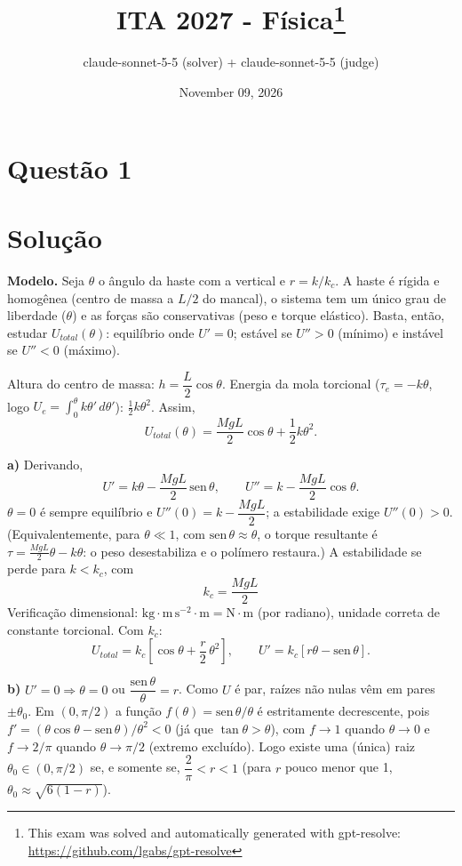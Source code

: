 \documentclass{article}%
\title{ITA 2027 - Física\thanks{This exam was solved and automatically generated with gpt-resolve: \url{https://github.com/lgabs/gpt-resolve}}}%
\author{claude{-}sonnet{-}5{-}5 (solver) + claude{-}sonnet{-}5{-}5 (judge)}%
\date{November 09, 2026}%
\begin{document}
%
\normalsize%
\maketitle%
\section*{Questão 1}

\section*{Solução}

\textbf{Modelo.} Seja $\theta$ o ângulo da haste com a vertical e $r=k/k_c$. A haste é rígida e homogênea (centro de massa a $L/2$ do mancal), o sistema tem um único grau de liberdade ($\theta$) e as forças são conservativas (peso e torque elástico). Basta, então, estudar $U_{total}(\theta)$: equilíbrio onde $U'=0$; estável se $U''>0$ (mínimo) e instável se $U''<0$ (máximo).

Altura do centro de massa: $h=\dfrac{L}{2}\cos\theta$. Energia da mola torcional ($\tau_e=-k\theta$, logo $U_e=\int_0^\theta k\theta'\,d\theta'$): $\tfrac12 k\theta^2$. Assim,
\[
U_{total}(\theta)=\frac{MgL}{2}\cos\theta+\frac12 k\theta^{2}.
\]

\textbf{a)} Derivando,
\[
U'=k\theta-\frac{MgL}{2}\,\mathrm{sen}\,\theta ,\qquad
U''=k-\frac{MgL}{2}\cos\theta .
\]
$\theta=0$ é sempre equilíbrio e $U''(0)=k-\dfrac{MgL}{2}$; a estabilidade exige $U''(0)>0$. (Equivalentemente, para $\theta\ll1$, com $\mathrm{sen}\,\theta\approx\theta$, o torque resultante é $\tau=\frac{MgL}{2}\theta-k\theta$: o peso desestabiliza e o polímero restaura.) A estabilidade se perde para $k<k_c$, com
\[
\boxed{k_c=\frac{MgL}{2}}
\]
Verificação dimensional: $\mathrm{kg\cdot m\,s^{-2}\cdot m}=\mathrm{N\cdot m}$ (por radiano), unidade correta de constante torcional. Com $k_c$:
\[
U_{total}=k_c\left[\cos\theta+\frac r2\,\theta^2\right],\qquad U'=k_c\left[r\theta-\mathrm{sen}\,\theta\right].
\]

\textbf{b)} $U'=0\Rightarrow\theta=0$ ou $\dfrac{\mathrm{sen}\,\theta}{\theta}=r$. Como $U$ é par, raízes não nulas vêm em pares $\pm\theta_0$. Em $(0,\pi/2)$ a função $f(\theta)=\mathrm{sen}\,\theta/\theta$ é estritamente decrescente, pois $f'=(\theta\cos\theta-\mathrm{sen}\,\theta)/\theta^2<0$ (já que $\tan\theta>\theta$), com $f\to1$ quando $\theta\to0$ e $f\to2/\pi$ quando $\theta\to\pi/2$ (extremo excluído). Logo existe uma (única) raiz $\theta_0\in(0,\pi/2)$ se, e somente se, $\dfrac2\pi<r<1$ (para $r$ pouco menor que 1, $\theta_0\approx\sqrt{6(1-r)}$).
\end{document}
